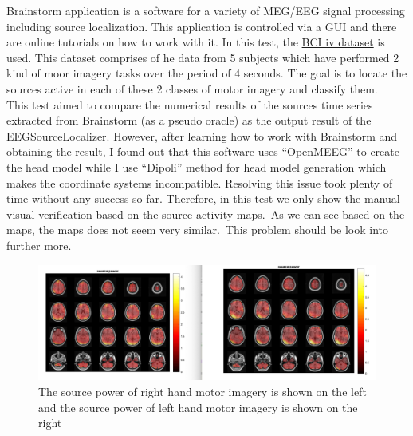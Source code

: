 \documentclass[12pt, titlepage]{article}
\renewcommand{\progname}{EEGSourceLocalizer}
\begin{document}
Brainstorm application is a software for a variety of MEG/EEG signal processing including source localization. This application is controlled via a GUI and there are online tutorials on how to work with it. In this test, the \href{http://www.bbci.de/competition/iv/}{BCI iv dataset} is used. This dataset comprises of he data from 5 subjects which have performed 2 kind of moor imagery tasks over the period of 4 seconds. The goal is to locate the sources active in each of these 2 classes of motor imagery and classify them.\\

This test aimed to compare the numerical results of the sources time series extracted from Brainstorm (as a pseudo oracle) as the output result of the \progname{}. However, after learning how to work with Brainstorm and obtaining the result, I found out that this software uses \enquote{\href{https://openmeeg.github.io}{OpenMEEG}} to create the head model while I use \enquote{Dipoli} method for head model generation which makes the coordinate systems incompatible. Resolving this issue took plenty of time without any success so far. Therefore, in this test we only show the manual visual verification based on the source activity maps.\ As we can see based on the maps, the maps does not seem very similar.\ This problem should be look into further more.\\

\begin{figure}[H]
\centering
  \includegraphics[scale=0.4]{bci_rightleft.png}
  \caption{The source power of right hand motor imagery is shown on the left and the source power of left hand motor imagery is shown on the right}
\label{Fig_bci}
\end{figure}
\end{document}
